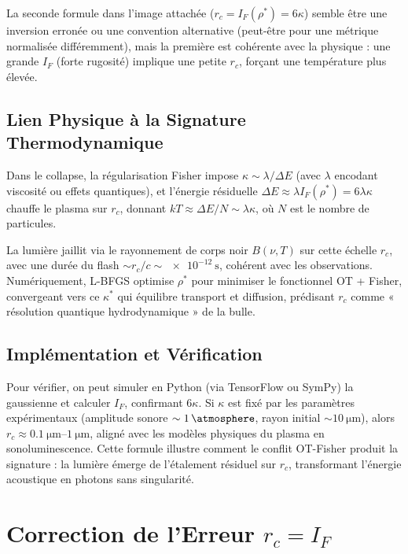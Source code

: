 \documentclass[a4paper,12pt]{article}
\begin{document}
La seconde formule dans l'image attachée (\( r_c = I_F(\rho^*) = 6 \kappa \))
semble être une inversion erronée ou une convention alternative
(peut-être pour une métrique normalisée différemment),
mais la première est cohérente avec la physique :
une grande \( I_F \) (forte rugosité) implique une petite \( r_c \), forçant une température plus élevée.

\subsection{Lien Physique à la Signature Thermodynamique}
Dans le collapse, la régularisation Fisher impose
\( \kappa \sim \lambda / \Delta E \)
(avec \( \lambda \) encodant viscosité ou effets quantiques),
et l'énergie résiduelle
\( \Delta E \approx \lambda I_F(\rho^*) = 6 \lambda \kappa \)
chauffe le plasma sur \( r_c \),
donnant
\( k T \approx \Delta E / N \sim \lambda \kappa \),
où \( N \) est le nombre de particules.

La lumière jaillit via le rayonnement de corps noir \( B(\nu, T) \) sur cette échelle \( r_c \),
avec une durée du flash \(\sim r_c / c \sim \SI{e-12}{\second}\),
cohérent avec les observations.
Numériquement, L-BFGS optimise \( \rho^* \) pour minimiser le fonctionnel OT + Fisher,
convergeant vers ce \( \kappa^* \) qui équilibre transport et diffusion,
prédisant \( r_c \) comme « résolution quantique hydrodynamique » de la bulle.

\subsection{Implémentation et Vérification}
Pour vérifier, on peut simuler en Python (via TensorFlow ou SymPy) la gaussienne et calculer \( I_F \),
confirmant \( 6 \kappa \).
Si \( \kappa \) est fixé par les paramètres expérimentaux (amplitude sonore \(\sim \SI{1}{\atmosphere}\), rayon initial \(\sim \SI{10}{\micro\meter}\)),
alors \( r_c \approx \SIrange{0.1}{1}{\micro\meter} \),
aligné avec les modèles physiques du plasma en sonoluminescence.
Cette formule illustre comment le conflit OT-Fisher produit la signature :
la lumière émerge de l'étalement résiduel sur \( r_c \),
transformant l'énergie acoustique en photons sans singularité.
\newpage
\section{Correction de l'Erreur \( r_c = I_F \)}
\end{document}
